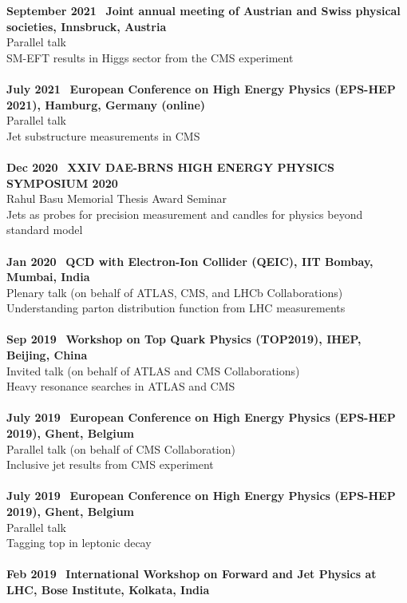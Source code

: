 \documentclass[a4paper,11pt]{article}
\begin{document}
\textbf{September 2021} \ \textbf{Joint annual meeting of Austrian and Swiss physical societies, Innsbruck, Austria} \\
Parallel talk \\
SM-EFT results in Higgs sector from the CMS experiment\\
\\
\textbf{July 2021} \ \textbf{European Conference on High Energy Physics (EPS-HEP 2021), Hamburg, Germany (online)} \\
Parallel talk \\
Jet substructure measurements in CMS\\
\\
\textbf{Dec 2020} \ \textbf{XXIV DAE-BRNS HIGH ENERGY PHYSICS SYMPOSIUM 2020} \\
Rahul Basu Memorial Thesis Award Seminar \\
Jets as probes for precision measurement and candles for physics beyond standard model\\
\\
\textbf{Jan 2020} \ \textbf{QCD with Electron-Ion Collider (QEIC), IIT Bombay, Mumbai, India} \\
Plenary talk (on behalf of ATLAS, CMS, and LHCb Collaborations) \\
Understanding parton distribution function from LHC measurements\\
\\
\textbf{Sep 2019} \ \textbf{Workshop on Top Quark Physics (TOP2019), IHEP, Beijing, China} \\
Invited talk (on behalf of ATLAS and CMS Collaborations) \\
Heavy resonance searches in ATLAS and CMS \\
\\
\textbf{July 2019} \ \textbf{European Conference on High Energy Physics (EPS-HEP 2019), Ghent, Belgium} \\
Parallel talk (on behalf of CMS Collaboration) \\
Inclusive jet results from CMS experiment  \\
\\
\textbf{July 2019} \ \textbf{European Conference on High Energy Physics (EPS-HEP 2019), Ghent, Belgium} \\
Parallel talk \\
Tagging top in leptonic decay \\
\\
\textbf{Feb 2019} \ \textbf{International Workshop on Forward and Jet Physics at LHC, Bose Institute, Kolkata, India} \\
\end{document}
